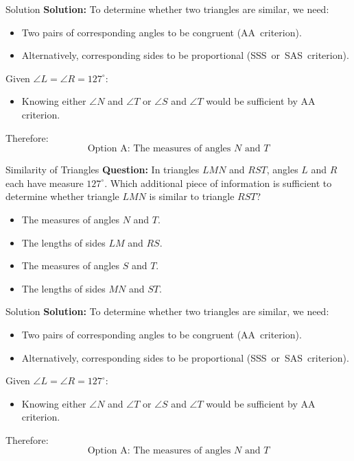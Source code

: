 \documentclass{beamer}
\begin{document}
\begin{frame}{Solution}
\textbf{Solution:}
To determine whether two triangles are similar, we need:
\begin{itemize}
    \item Two pairs of corresponding angles to be congruent (AA~criterion).
    \item Alternatively, corresponding sides to be proportional (SSS~or~SAS~criterion).
\end{itemize}
Given \( \angle L = \angle R = 127^\circ \):
\begin{itemize}
    \item Knowing either \( \angle N \) and \( \angle T \) or \( \angle S \) and \( \angle T \) would be sufficient by AA criterion.
\end{itemize}
Therefore:
\[
\boxed{\text{Option A: The measures of angles } N \text{ and } T}
\]
\end{frame}


\begin{frame}{Similarity of Triangles}
\textbf{Question:}
In triangles \(LMN\) and \(RST\), angles \(L\) and \(R\) each have measure \(127^\circ\). Which additional piece of information is sufficient to determine whether triangle \(LMN\) is similar to triangle \(RST\)?
\begin{itemize}
    \item[A]The measures of angles \(N\) and \(T\).
    \item[B] The lengths of sides \(LM\) and \(RS\).
    \item[C]The measures of angles \(S\) and \(T\).
    \item[D]The lengths of sides \(MN\) and \(ST\).


\end{itemize}
\end{frame}


\begin{frame}{Solution}
\textbf{Solution:}
To determine whether two triangles are similar, we need:
\begin{itemize}
    \item Two pairs of corresponding angles to be congruent (AA~criterion).
    \item Alternatively, corresponding sides to be proportional (SSS~or~SAS~criterion).
\end{itemize}
Given \( \angle L = \angle R = 127^\circ \):
\begin{itemize}
    \item Knowing either \( \angle N \) and \( \angle T \) or \( \angle S \) and \( \angle T \) would be sufficient by AA criterion.
\end{itemize}
Therefore:
\[
\boxed{\text{Option A: The measures of angles } N \text{ and } T}
\]
\end{frame}
\end{document}
